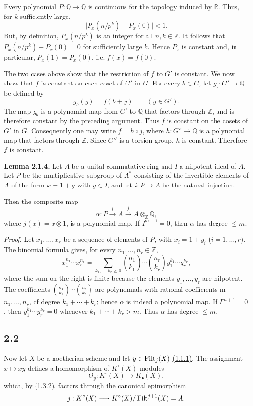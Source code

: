 Every polynomial $P:\mathbb Q\to\mathbb Q$ is continuous for the topology
induced by $\mathbb R$. Thus, for $k$ sufficiently large,
\[
\lvert P_x(n/p^k)-P_x(0)\rvert<1.
\]
But, by definition, $P_x(n/p^k)$ is an integer for all
$n,k\in\mathbb Z$. It follows that $P_x(n/p^k)-P_x(0)=0$ for sufficiently
large $k$. Hence $P_x$ is constant and, in particular,
$P_x(1)=P_x(0)$, i.e. $f(x)=f(0)$.

The two cases above show that the restriction of $f$ to $G'$ is constant.
We now show that $f$ is constant on each coset of $G'$ in $G$. For every
$b\in G$, let $g_b:G'\to\mathbb Q$ be defined by
\[
g_b(y)=f(b+y)\qquad(y\in G').
\]
The map $g_b$ is a polynomial map from $G'$ to $\mathbb Q$ that factors
through $\mathbb Z$, and is therefore constant by the preceding argument.
Thus $f$ is constant on the cosets of $G'$ in $G$. Consequently one may
write $f=h\circ j$, where $h:G''\to\mathbb Q$ is a polynomial map that
factors through $\mathbb Z$. Since $G''$ is a torsion group, $h$ is constant.
Therefore $f$ is constant.

\textbf{Lemma 2.1.4.}
Let $A$ be a unital commutative ring and $I$ a nilpotent ideal of $A$. Let
$P$ be the multiplicative subgroup of $A^*$ consisting of the invertible elements
of $A$ of the form $x=1+y$ with $y\in I$, and let $i:P\to A$ be the natural
injection.

Then the composite map
\[
\alpha:P\xrightarrow{i}A\xrightarrow{j}A\otimes_{\mathbb Z}\mathbb Q,
\]
where $j(x)=x\otimes1$, is a polynomial map. If $I^{m+1}=0$, then $\alpha$
has degree $\leq m$.

\emph{Proof.}
Let $x_1,\ldots,x_r$ be a sequence of elements of $P$, with
$x_i=1+y_i$ ($i=1,\ldots,r$). The binomial formula gives, for every
$n_1,\ldots,n_r\in\mathbb Z$,
\begin{equation}\tag{2.1.5}
x_1^{n_1}\cdots x_r^{n_r}=
\sum_{k_1,\ldots,k_r\geq0}
\binom{n_1}{k_1}\cdots\binom{n_r}{k_r}
y_1^{k_1}\cdots y_r^{k_r},
\end{equation}
where the sum on the right is finite because the elements
$y_1,\ldots,y_r$ are nilpotent. The coefficients
$\binom{n_1}{k_1}\cdots\binom{n_r}{k_r}$ are polynomials with rational
coefficients in $n_1,\ldots,n_r$, of degree $k_1+\cdots+k_r$; hence
$\alpha$ is indeed a polynomial map. If $I^{m+1}=0$, then
$y_1^{k_1}\cdots y_r^{k_r}=0$ whenever $k_1+\cdots+k_r>m$. Thus $\alpha$
has degree $\leq m$.

\subsection*{2.2}
Now let $X$ be a noetherian scheme and let $y\in\operatorname{Filt}_j(X)$ \hyperlink{sga6.e10.def.1-1-1}{(1.1.1)}. The
assignment $x\mapsto xy$ defines a homomorphism of $K^\circ(X)$-modules
\[
\Theta_y:K^\circ(X)\longrightarrow K_\bullet(X),
\]
which, by \hyperlink{sga6.e10.thm.1-3-2}{(1.3.2)}, factors through the canonical epimorphism
\[
j:K^\circ(X)\longrightarrow
K^\circ(X)/\operatorname{Filt}^{j+1}(X)=A.
\]

